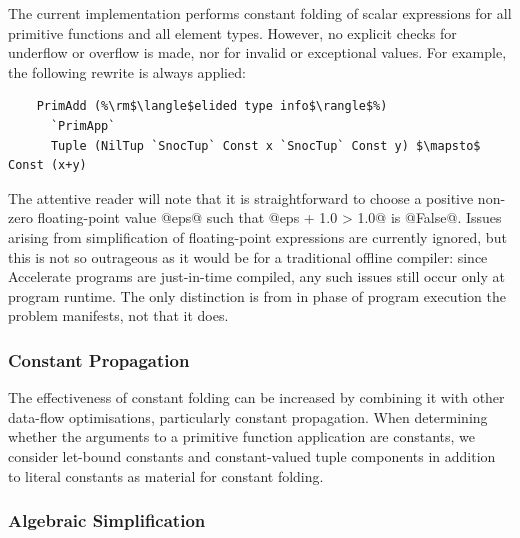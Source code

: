 The current implementation performs constant folding of scalar expressions for
all primitive functions and all element types. However, no explicit checks for
underflow or overflow is made, nor for invalid or exceptional values. For
example, the following rewrite is always applied:
%
%
\begin{lstlisting}[style=Haskell,numbers=none,mathescape]
%\bf$\langle$ constant folding $\rangle$%
    PrimAdd (%\rm$\langle$elided type info$\rangle$%)
      `PrimApp`
      Tuple (NilTup `SnocTup` Const x `SnocTup` Const y) $\mapsto$ Const (x+y)
\end{lstlisting}
%
The attentive reader will note that it is straightforward to choose a positive
non-zero floating-point value @eps@ such that @eps + 1.0 > 1.0@ is
@False@. Issues arising from simplification of floating-point expressions
are currently ignored, but this is not so outrageous as it would be for a
traditional offline compiler: since Accelerate programs are just-in-time
compiled, any such issues still occur only at program runtime. The only
distinction is from in phase of program execution the problem manifests, not
that it does.



\subsubsection{Constant Propagation}

The effectiveness of constant folding can be increased by combining it with
other data-flow optimisations, particularly constant propagation. When
determining whether the arguments to a primitive function application are
constants, we consider let-bound constants and constant-valued tuple components
in addition to literal constants as material for constant folding.


\subsubsection{Algebraic Simplification}

